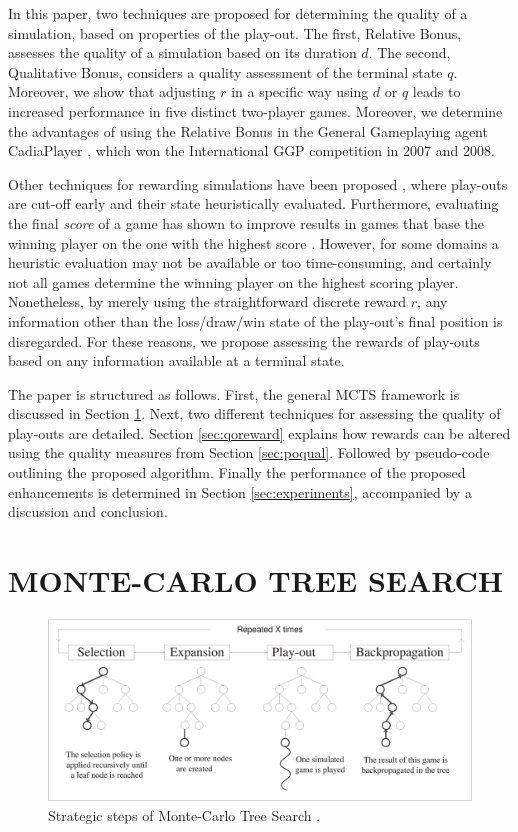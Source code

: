 \documentclass{ecai2014}
\begin{document}
In this paper, two techniques are proposed for determining the quality of a simulation, based on properties of the play-out. The first, Relative Bonus, assesses the quality of a simulation based on its duration $d$. The second, Qualitative Bonus, considers a quality assessment of the terminal state $q$. Moreover, we show that adjusting $r$ in a specific way using $d$ or $q$ leads to increased performance in five distinct two-player games. Moreover, we determine the advantages of using the Relative Bonus in the General Gameplaying agent {\sc CadiaPlayer} \cite{bjornsson2009cadiaplayer}, which won the International GGP competition in 2007 and 2008.

Other techniques for rewarding simulations have been proposed \cite{Winands2011}, where play-outs are cut-off early and their state heuristically evaluated. Furthermore, evaluating the final \emph{score} of a game has shown to improve results in games that base the winning player on the one with the highest score \cite{shibahara2008combining}. However, for some domains a heuristic evaluation may not be available or too time-consuming, and certainly not all games determine the winning player on the highest scoring player. Nonetheless, by merely using the straightforward discrete reward $r$, any information other than the loss/draw/win state of the play-out's final position is disregarded. For these reasons, we propose assessing the rewards of play-outs based on any information available at a terminal state.

The paper is structured as follows. First, the general MCTS framework is discussed in Section \ref{sec:mcts}. Next, two different techniques for assessing the quality of play-outs are detailed. Section \ref{sec:qoreward} explains how rewards can be altered using the quality measures from Section \ref{sec:poqual}. Followed by pseudo-code outlining the proposed algorithm. Finally the performance of the proposed enhancements is determined in Section \ref{sec:experiments}, accompanied by a discussion and conclusion.

\section{MONTE-CARLO TREE SEARCH}
\label{sec:mcts}
\begin{figure}[ht]
	\centering
	\includegraphics[width=.45\textwidth]{img/figure1.eps}
	\caption{Strategic steps of Monte-Carlo Tree Search \cite{chaslot2008progressive}.}
	\label{fig:mcts-algorithm}
\end{figure}
\end{document}
